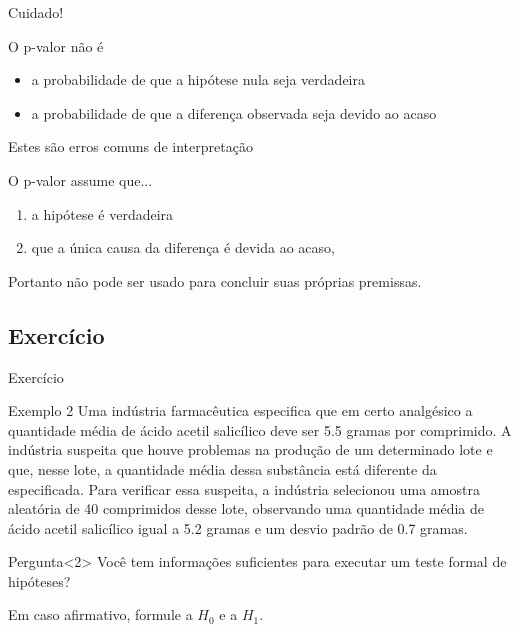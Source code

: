 \documentclass{beamer}
\begin{document}
\begin{frame}{Cuidado!}
  \small
  \begin{block}{O p-valor \alert{não é}}
    \begin{itemize}
      \footnotesize
    \item a probabilidade de que a hipótese nula seja verdadeira
    \item a probabilidade de que a diferença observada seja devido ao
      acaso
    \end{itemize}
  \end{block}
  \begin{center}
    Estes são erros comuns de interpretação
  \end{center}
  \begin{block}{O p-valor assume que...}
    \small
    \begin{enumerate}
      \footnotesize
    \item a hipótese é verdadeira
    \item que a \alert{única} causa da diferença é devida ao acaso,
    \end{enumerate}
    \begin{center}
      Portanto não pode ser usado para concluir suas próprias
      premissas.
    \end{center}
  \end{block}
\end{frame}

\subsection{Exercício}

\begin{frame}{Exercício}
  \begin{exampleblock}{Exemplo 2}
    \footnotesize
    Uma indústria farmacêutica especifica que em certo analgésico a
    quantidade média de ácido acetil salicílico deve ser 5.5 gramas
    por comprimido. A indústria suspeita que houve problemas na
    produção de um determinado lote e que, nesse lote, a quantidade
    média dessa substância está diferente da especificada. Para
    verificar essa suspeita, a indústria selecionou uma amostra
    aleatória de 40 comprimidos desse lote, observando uma quantidade
    média de ácido acetil salicílico igual a 5.2 gramas e um desvio
    padrão de 0.7 gramas.
  \end{exampleblock}
  \begin{block}{Pergunta}<2>
    Você tem informações suficientes para executar um teste formal de hipóteses?

    Em caso afirmativo, formule a $H_0$ e a $H_1$.
  \end{block}
\end{frame}
\end{document}

